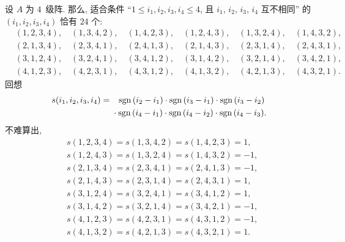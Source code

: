 \documentclass[../libro.tex]{subfiles}
\begin{document}
\begin{example}
    设 \(A\) 为 \(4\)~级阵.
    那么, 适合条件
    ``\(1 \leq i_1, i_2, i_3, i_4 \leq 4\),
    且 \(i_1\), \(i_2\), \(i_3\), \(i_4\) 互不相同'' 的
    \((i_1, i_2, i_3, i_4)\) 恰有 \(24\) 个:
    \begin{align*}
        &
        (1, 2, 3, 4), \quad (1, 3, 4, 2), \quad (1, 4, 2, 3),
        \quad
        (1, 2, 4, 3), \quad (1, 3, 2, 4), \quad (1, 4, 3, 2),
        \\
        &
        (2, 1, 3, 4), \quad (2, 3, 4, 1), \quad (2, 4, 1, 3),
        \quad
        (2, 1, 4, 3), \quad (2, 3, 1, 4), \quad (2, 4, 3, 1),
        \\
        &
        (3, 1, 2, 4), \quad (3, 2, 4, 1), \quad (3, 4, 1, 2),
        \quad
        (3, 1, 4, 2), \quad (3, 2, 1, 4), \quad (3, 4, 2, 1),
        \\
        &
        (4, 1, 2, 3), \quad (4, 2, 3, 1), \quad (4, 3, 1, 2),
        \quad
        (4, 1, 3, 2), \quad (4, 2, 1, 3), \quad (4, 3, 2, 1).
    \end{align*}
    回想
    \begin{align*}
        s(i_1, i_2, i_3, i_4)
        = {} &
        \hphantom{\cdot\,\,}
        \operatorname{sgn} {(i_2 - i_1)}
        \cdot \operatorname{sgn} {(i_3 - i_1)}
        \cdot \operatorname{sgn} {(i_3 - i_2)}
        \\
        &
        \cdot \operatorname{sgn} {(i_4 - i_1)}
        \cdot \operatorname{sgn} {(i_4 - i_2)}
        \cdot \operatorname{sgn} {(i_4 - i_3)}.
    \end{align*}
    不难算出,
    \begin{align*}
        & s(1, 2, 3, 4) = s(1, 3, 4, 2) = s(1, 4, 2, 3) = 1,
        \\
        & s(1, 2, 4, 3) = s(1, 3, 2, 4) = s(1, 4, 3, 2) = -1,
        \\
        & s(2, 1, 3, 4) = s(2, 3, 4, 1) = s(2, 4, 1, 3) = -1,
        \\
        & s(2, 1, 4, 3) = s(2, 3, 1, 4) = s(2, 4, 3, 1) = 1,
        \\
        & s(3, 1, 2, 4) = s(3, 2, 4, 1) = s(3, 4, 1, 2) = 1,
        \\
        & s(3, 1, 4, 2) = s(3, 2, 1, 4) = s(3, 4, 2, 1) = -1,
        \\
        & s(4, 1, 2, 3) = s(4, 2, 3, 1) = s(4, 3, 1, 2) = -1,
        \\
        & s(4, 1, 3, 2) = s(4, 2, 1, 3) = s(4, 3, 2, 1) = 1.
    \end{align*}

\end{example}
\end{document}
